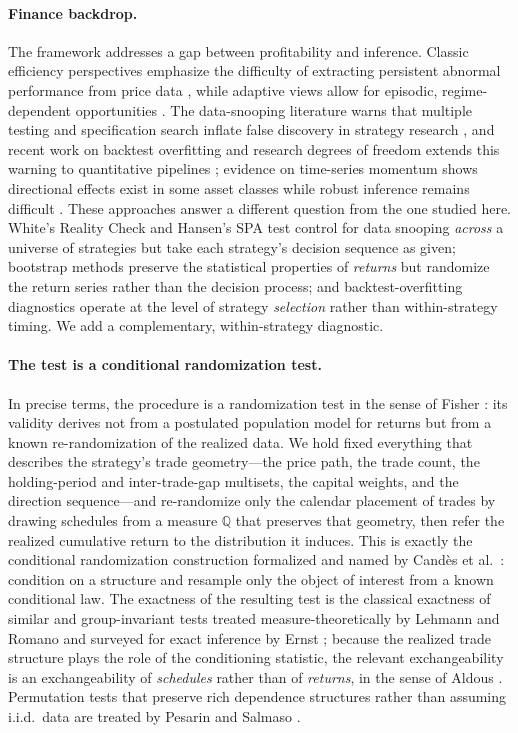 \documentclass[preprint,12pt]{elsarticle}
\theoremstyle{definition}
\begin{document}
\paragraph{Finance backdrop.} The framework addresses a gap between profitability and inference. Classic efficiency perspectives emphasize the difficulty of extracting persistent abnormal performance from price data \cite{fama1970}, while adaptive views allow for episodic, regime-dependent opportunities \cite{lo2004}. The data-snooping literature warns that multiple testing and specification search inflate false discovery in strategy research \cite{white2000,hansen2005,sullivan1999}, and recent work on backtest overfitting and research degrees of freedom extends this warning to quantitative pipelines \cite{bailey2017,baileylopez2014,lopezdeprado2018}; evidence on time-series momentum shows directional effects exist in some asset classes while robust inference remains difficult \cite{moskowitz2012}. These approaches answer a different question from the one studied here. White's Reality Check \cite{white2000} and Hansen's SPA test \cite{hansen2005} control for data snooping \emph{across} a universe of strategies but take each strategy's decision sequence as given; bootstrap methods \cite{politisromano1994,Kunsch1989} preserve the statistical properties of \emph{returns} but randomize the return series rather than the decision process; and backtest-overfitting diagnostics \cite{bailey2017} operate at the level of strategy \emph{selection} rather than within-strategy timing. We add a complementary, within-strategy diagnostic.

\paragraph{The test is a conditional randomization test.} In precise terms, the procedure is a randomization test in the sense of Fisher \cite{Fisher1935}: its validity derives not from a postulated population model for returns but from a known re-randomization of the realized data. We hold fixed everything that describes the strategy's trade geometry---the price path, the trade count, the holding-period and inter-trade-gap multisets, the capital weights, and the direction sequence---and re-randomize only the calendar placement of trades by drawing schedules from a measure $\mathbb{Q}$ that preserves that geometry, then refer the realized cumulative return to the distribution it induces. This is exactly the conditional randomization construction formalized and named by Cand\`es et al.\ \cite{Candes2018}: condition on a structure and resample only the object of interest from a known conditional law. The exactness of the resulting test is the classical exactness of similar and group-invariant tests treated measure-theoretically by Lehmann and Romano \cite{LehmannRomano2005} and surveyed for exact inference by Ernst \cite{Ernst2004}; because the realized trade structure plays the role of the conditioning statistic, the relevant exchangeability is an exchangeability of \emph{schedules} rather than of \emph{returns}, in the sense of Aldous \cite{Aldous1985}. Permutation tests that preserve rich dependence structures rather than assuming i.i.d.\ data are treated by Pesarin and Salmaso \cite{PesarinSalmaso2010}.
\end{document}
